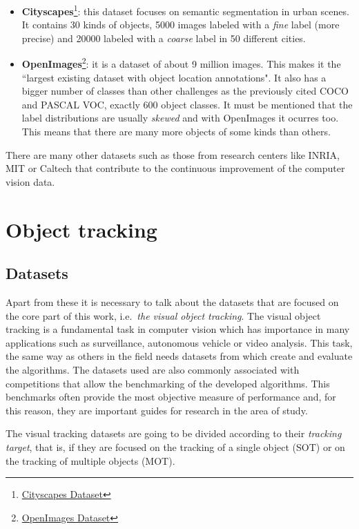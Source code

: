 \begin{itemize}
\item \textbf{Cityscapes}\footnote {\href{https://www.cityscapes-dataset.com/}{Cityscapes Dataset}}: this dataset focuses on semantic segmentation in urban scenes. It contains 30 kinds of objects, 5000 images labeled with a \textit{fine} label (more precise) and 20000 labeled with a \textit{coarse} label in 50 different cities.
\item \textbf{OpenImages}\footnote {\href{https://storage.googleapis.com/openimages/web/index.html}{OpenImages Dataset}}: it is a dataset of about 9 million images. This makes it the ``largest existing dataset with object location annotations". It also has a bigger number of classes than other challenges as the previously cited COCO and PASCAL VOC, exactly 600 object classes. It must be mentioned that the label distributions are usually \textit{skewed} and with OpenImages it ocurres too. This means that there are many more objects of some kinds than others.
\end{itemize}
There are many other datasets such as those from research centers like INRIA, MIT or Caltech that contribute to the continuous improvement of the computer vision data.
\section{Object tracking}
\subsection{Datasets}
Apart from these it is necessary to talk about the datasets that are focused on the core part of this work, i.e.\ \textit{the visual object tracking}. The visual object tracking is a fundamental task in computer vision which has importance in many applications such as surveillance, autonomous vehicle or video analysis. This task, the same way as others in the field needs datasets from which create and evaluate the algorithms. The datasets used are also commonly associated with competitions that allow the benchmarking of the developed algorithms. This benchmarks often provide the most objective measure of performance and, for this reason, they are important guides for research in the area of study.

The visual tracking datasets are going to be divided according to their \textit{tracking target}, that is, if they are focused on the tracking of a single object (SOT) or on the tracking of multiple objects (MOT).
